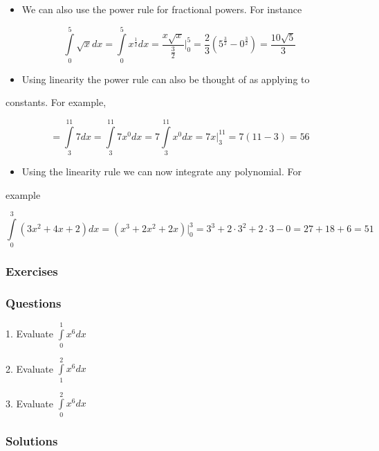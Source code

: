 \begin{itemize}
    \item We can also use the power rule for fractional powers. For instance
\end{itemize}

\[
\int\limits_0^5\sqrt{x}dx=\int\limits_0^5x^\frac12dx=\frac{x\sqrt{x}}{\frac32}\Bigg| _0^5=\frac23\left(5^\frac32-0^\frac32\right)=\frac{10\sqrt5}{3}
\]


\begin{itemize}
    \item Using linearity the power rule can also be thought of as applying to
\end{itemize}
    constants. For example,


\[
=\int\limits_3^{11}7dx=\int\limits_3^{11}7x^0dx=7\int\limits_3^{11}x^0dx=7x\Bigg| _3^{11}=7(11-3)=56
\]


\begin{itemize}
    \item Using the linearity rule we can now integrate any polynomial. For
\end{itemize}
    example


\[
\int\limits_0^3(3x^2+4x+2)dx=(x^3+2x^2+2x)\Bigg| _0^3=3^3+2\cdot 3^2+2\cdot3-0=27+18+6=51
\]


\subsubsection{Exercises}
\label{sss:exer-ef8a}


\subsubsection{Questions}
\label{sss:ques-4786}


1.  Evaluate $\int\limits_0^1x^6dx$

2.  Evaluate $\int\limits_1^2x^6dx$

3.  Evaluate $\int\limits_0^2x^6dx$


\subsubsection{Solutions}
\label{sss:solu-8692}


